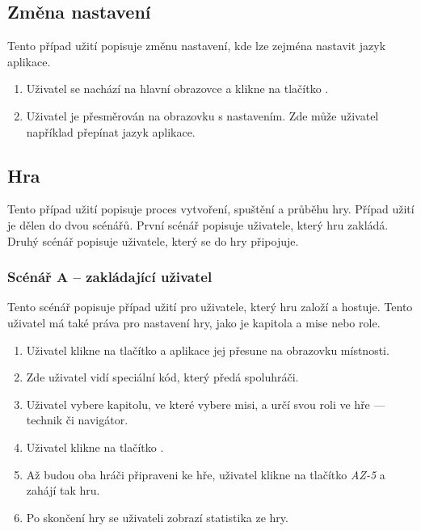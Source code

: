 \subsection{Změna nastavení}

Tento případ užití popisuje změnu nastavení,
kde lze zejména nastavit jazyk aplikace.

\begin{enumerate}
    \item Uživatel se nachází na hlavní obrazovce a klikne na tlačítko
    .
    \item Uživatel je přesměrován na obrazovku s nastavením.
    Zde může uživatel například přepínat jazyk aplikace.
\end{enumerate}

\subsection{Hra}

Tento případ užití popisuje proces vytvoření, spuštění a průběhu hry.
Případ užití je dělen do dvou scénářů.
První scénář popisuje uživatele,
který hru zakládá.
Druhý scénář popisuje uživatele,
který se do hry připojuje.

\subsubsection*{Scénář A -- zakládající uživatel}

Tento scénář popisuje případ užití pro uživatele,
který hru založí a hostuje.
Tento uživatel má také práva pro nastavení hry,
jako je kapitola a mise nebo role.

\begin{enumerate}
    \item Uživatel klikne na tlačítko 
    a aplikace jej přesune na obrazovku místnosti.
    \item Zde uživatel vidí speciální kód,
    který předá spoluhráči.
    \item Uživatel vybere kapitolu,
    ve které vybere misi,
    a určí svou roli ve hře
    --- technik či navigátor.
    \item Uživatel klikne na tlačítko .
    \item Až budou oba hráči připraveni ke hře,
    uživatel klikne na tlačítko \emph{AZ-5} a zahájí tak hru.
    \item Po skončení hry se uživateli zobrazí statistika ze hry.
\end{enumerate}

